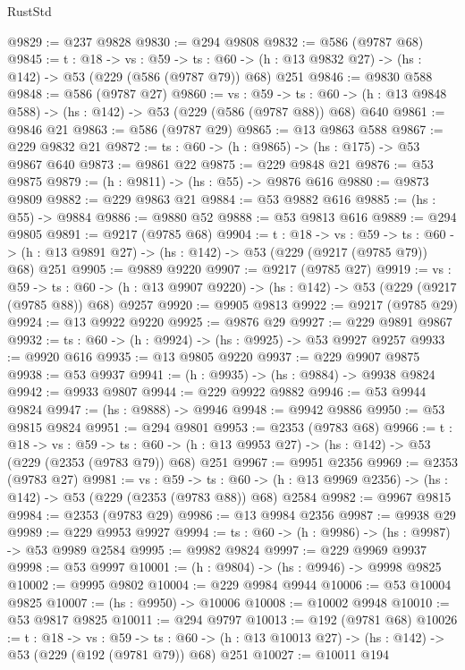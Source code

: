 \begin{lexlean}{RustStd}
\begin{coremodule}
@9829 := @237 @9828
@9830 := @294 @9808
@9832 := @586 (@9787 @68)
@9845 := {t : @18} ->
  {vs : @59} ->
  {ts : @60} -> (h : @13 @9832 @27) -> (hs : @142) -> @53 (@229 (@586 (@9787 @79)) @68) @251
@9846 := @9830 @588
@9848 := @586 (@9787 @27)
@9860 := {vs : @59} ->
  {ts : @60} -> (h : @13 @9848 @588) -> (hs : @142) -> @53 (@229 (@586 (@9787 @88)) @68) @640
@9861 := @9846 @21
@9863 := @586 (@9787 @29)
@9865 := @13 @9863 @588
@9867 := @229 @9832 @21
@9872 := {ts : @60} -> (h : @9865) -> (hs : @175) -> @53 @9867 @640
@9873 := @9861 @22
@9875 := @229 @9848 @21
@9876 := @53 @9875
@9879 := (h : @9811) -> (hs : @55) -> @9876 @616
@9880 := @9873 @9809
@9882 := @229 @9863 @21
@9884 := @53 @9882 @616
@9885 := (hs : @55) -> @9884
@9886 := @9880 @52
@9888 := @53 @9813 @616
@9889 := @294 @9805
@9891 := @9217 (@9785 @68)
@9904 := {t : @18} ->
  {vs : @59} ->
  {ts : @60} -> (h : @13 @9891 @27) -> (hs : @142) -> @53 (@229 (@9217 (@9785 @79)) @68) @251
@9905 := @9889 @9220
@9907 := @9217 (@9785 @27)
@9919 := {vs : @59} ->
  {ts : @60} -> (h : @13 @9907 @9220) -> (hs : @142) -> @53 (@229 (@9217 (@9785 @88)) @68) @9257
@9920 := @9905 @9813
@9922 := @9217 (@9785 @29)
@9924 := @13 @9922 @9220
@9925 := @9876 @29
@9927 := @229 @9891 @9867
@9932 := {ts : @60} -> (h : @9924) -> (hs : @9925) -> @53 @9927 @9257
@9933 := @9920 @616
@9935 := @13 @9805 @9220
@9937 := @229 @9907 @9875
@9938 := @53 @9937
@9941 := (h : @9935) -> (hs : @9884) -> @9938 @9824
@9942 := @9933 @9807
@9944 := @229 @9922 @9882
@9946 := @53 @9944 @9824
@9947 := (hs : @9888) -> @9946
@9948 := @9942 @9886
@9950 := @53 @9815 @9824
@9951 := @294 @9801
@9953 := @2353 (@9783 @68)
@9966 := {t : @18} ->
  {vs : @59} ->
  {ts : @60} -> (h : @13 @9953 @27) -> (hs : @142) -> @53 (@229 (@2353 (@9783 @79)) @68) @251
@9967 := @9951 @2356
@9969 := @2353 (@9783 @27)
@9981 := {vs : @59} ->
  {ts : @60} -> (h : @13 @9969 @2356) -> (hs : @142) -> @53 (@229 (@2353 (@9783 @88)) @68) @2584
@9982 := @9967 @9815
@9984 := @2353 (@9783 @29)
@9986 := @13 @9984 @2356
@9987 := @9938 @29
@9989 := @229 @9953 @9927
@9994 := {ts : @60} -> (h : @9986) -> (hs : @9987) -> @53 @9989 @2584
@9995 := @9982 @9824
@9997 := @229 @9969 @9937
@9998 := @53 @9997
@10001 := (h : @9804) -> (hs : @9946) -> @9998 @9825
@10002 := @9995 @9802
@10004 := @229 @9984 @9944
@10006 := @53 @10004 @9825
@10007 := (hs : @9950) -> @10006
@10008 := @10002 @9948
@10010 := @53 @9817 @9825
@10011 := @294 @9797
@10013 := @192 (@9781 @68)
@10026 := {t : @18} ->
  {vs : @59} ->
  {ts : @60} -> (h : @13 @10013 @27) -> (hs : @142) -> @53 (@229 (@192 (@9781 @79)) @68) @251
@10027 := @10011 @194

\end{coremodule}
\end{lexlean}
